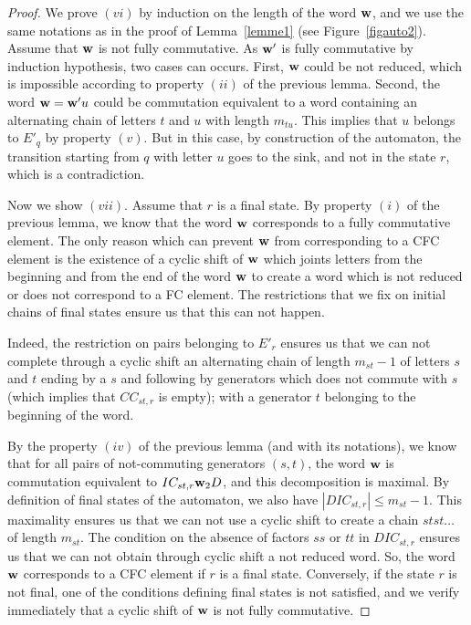 \documentclass[reqno,12pt]{amsart}
\theoremstyle{definition}
\begin{document}
\begin{proof}

 
We prove  $(vi)$ by induction  on the length of the word $\bf w$, and we use the same notations as in the proof of Lemma~\ref{lemme1} (see Figure~\ref{figauto2}). Assume that ${\bf w}$ is not fully commutative. As ${\bf w}'$ is fully commutative by induction hypothesis, two cases can occurs. First, ${\bf w}$ could be not reduced, which is impossible according to property $(ii)$ of the previous lemma. Second, the word  ${\bf w}={\bf w}'u$ could be commutation equivalent to a word containing an alternating chain of letters  $t$ and $u$ with length $m_{tu}$. This implies that $u $ belongs to $E'_q$ by property $(v)$. But in this case, by construction of the automaton, the transition starting from $q$ with letter $u$ goes to the sink, and not in the state $r$, which is a contradiction. 
 
\medskip

Now we show $(vii)$. Assume that $r$  is a final state. By property $(i)$ of the previous lemma, we know that the word  ${\bf w}$ corresponds to a fully commutative element.  The only reason which can prevent  ${\bf w}$ from corresponding to a CFC element is the existence of a cyclic shift of  ${\bf w}$ which joints letters from the beginning and from the end of the word $\bf w$ to create a word which is not reduced or does not correspond to a FC element. The restrictions that we fix on initial chains of final states ensure us that this can not happen.

 Indeed, the restriction on pairs belonging to $E'_r$ ensures us that we can not complete through a cyclic shift an alternating chain of length  $m_{st}-1$ of letters $s$ and $t$ ending by a $s$ and following by generators which does not commute with $s$ (which implies that $CC_{st,r}$ is empty); with a generator $t$ belonging to the beginning of the word.  
 
 By the property  $(iv)$ of the previous lemma (and with its notations), we know that for all pairs of not-commuting generators $(s,t)$, the word ${\bf w}$ is commutation equivalent to $IC_{st,r}{\bf w}_2 D$, and this decomposition is maximal. By definition of final states of the automaton, we also have  $|DIC_{st,r}|\leq m_{st}-1$. This maximality ensures us that we can not use a cyclic shift to create a chain  $stst\ldots $ of length $m_{st}$. The condition on the absence of factors $ss$ or $tt$ in $DIC_{st,r}$ ensures us that we can not obtain through cyclic shift a not reduced word. So, the word ${\bf w}$ corresponds to a CFC element if $r$ is a final state. Conversely, if the state $r$ is not final, one of the conditions defining final states is not satisfied, and we verify immediately that a cyclic shift of  ${\bf w}$ is not fully commutative.
 

\end{proof}
\end{document}
